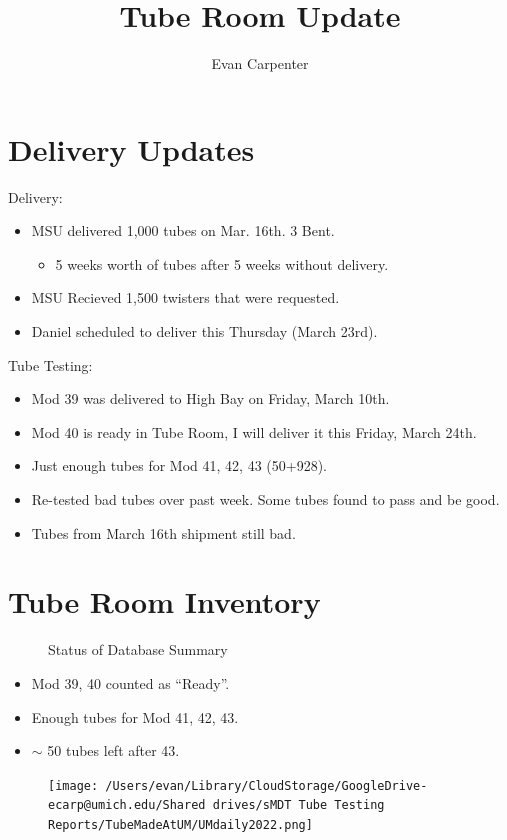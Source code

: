 \documentclass{beamer}
\title{Tube Room Update}
\author{Evan Carpenter}
\begin{document}
\begin{frame}
	\titlepage
\end{frame}
\section{Delivery Updates}
	\begin{frame}
		\begin{block}{Delivery:}
			\begin{itemize}
				\item MSU delivered 1,000 tubes on Mar. 16th. 3 Bent. 
				\begin{itemize}
					\item 5 weeks worth of tubes after 5 weeks without delivery.
				\end{itemize}
				\item MSU Recieved 1,500 twisters that were requested. 
				\item Daniel scheduled to deliver this Thursday (March 23rd).
			\end{itemize}
		\end{block}	
		\begin{block}{Tube Testing:}
			\begin{itemize}
				\item Mod 39 was delivered to High Bay on Friday, March 10th.
				\item Mod 40 is ready in Tube Room, I will deliver it this Friday, March 24th.
				\item Just enough tubes for Mod 41, 42, 43 (50+928).
				\item Re-tested bad tubes over past week. Some tubes found to pass and be good. 
				\item Tubes from March 16th shipment still bad. 
			\end{itemize}
		\end{block}
	\end{frame}

\section{Tube Room Inventory}	
		
		\begin{frame}
			\begin{figure}
				\centering
				\caption*{Status of Database Summary}
				\scalebox{0.6}{}
			\end{figure}
			\begin{itemize}
				\item Mod 39, 40 counted as ``Ready''.
				\item Enough tubes for Mod 41, 42, 43. 
				\item $\sim$ 50 tubes left after 43.
			\end{itemize}
				

		\end{frame}

		\begin{frame}
			\begin{figure}
				\texttt{[image: /Users/evan/Library/CloudStorage/GoogleDrive-ecarp@umich.edu/Shared drives/sMDT Tube Testing Reports/TubeMadeAtUM/UMdaily2022.png]}
			\end{figure}
		\end{frame}
\end{document}
